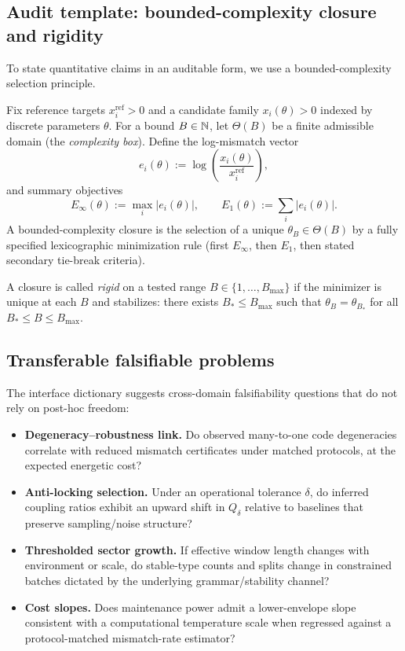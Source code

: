 \subsection{Audit template: bounded-complexity closure and rigidity}
To state quantitative claims in an auditable form, we use a bounded-complexity selection principle.

\begin{definition}\label{def:bc_closure_audit}
Fix reference targets $x_i^{\mathrm{ref}}>0$ and a candidate family $x_i(\theta)>0$ indexed by discrete parameters $\theta$.
For a bound $B\in\mathbb{N}$, let $\Theta(B)$ be a finite admissible domain (the \emph{complexity box}).
Define the log-mismatch vector
\[
e_i(\theta):=\log\!\left(\frac{x_i(\theta)}{x_i^{\mathrm{ref}}}\right),
\]
and summary objectives
\[
E_\infty(\theta):=\max_i |e_i(\theta)|,\qquad
E_1(\theta):=\sum_i |e_i(\theta)|.
\]
A bounded-complexity closure is the selection of a unique $\theta_B\in\Theta(B)$ by a fully specified lexicographic minimization rule (first $E_\infty$, then $E_1$, then stated secondary tie-break criteria).
\end{definition}

\begin{definition}\label{def:rigidity_certificate_audit}
A closure is called \emph{rigid} on a tested range $B\in\{1,\dots,B_{\max}\}$ if the minimizer is unique at each $B$ and stabilizes: there exists $B_\ast\le B_{\max}$ such that $\theta_B=\theta_{B_\ast}$ for all $B_\ast\le B\le B_{\max}$.
\end{definition}

\subsection{Transferable falsifiable problems}
The interface dictionary suggests cross-domain falsifiability questions that do not rely on post-hoc freedom:
\begin{itemize}
  \item \textbf{Degeneracy--robustness link.} Do observed many-to-one code degeneracies correlate with reduced mismatch certificates under matched protocols, at the expected energetic cost?
  \item \textbf{Anti-locking selection.} Under an operational tolerance $\delta$, do inferred coupling ratios exhibit an upward shift in $Q_\delta$ relative to baselines that preserve sampling/noise structure?
  \item \textbf{Thresholded sector growth.} If effective window length changes with environment or scale, do stable-type counts and splits change in constrained batches dictated by the underlying grammar/stability channel?
  \item \textbf{Cost slopes.} Does maintenance power admit a lower-envelope slope consistent with a computational temperature scale when regressed against a protocol-matched mismatch-rate estimator?
\end{itemize}


